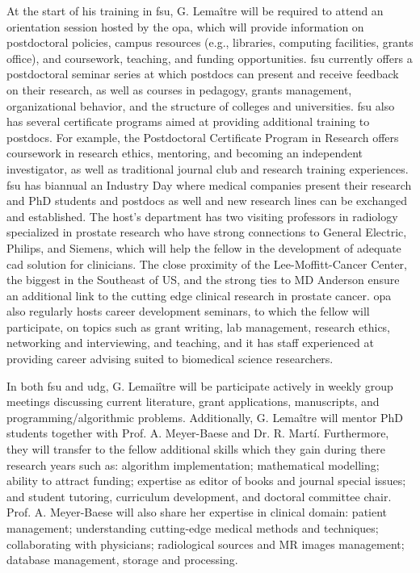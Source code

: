 At the start of his training in \ac{fsu}, G. Lema\^itre will be required to attend an orientation session hosted by the \ac{opa}, which will provide information on postdoctoral policies, campus resources (e.g., libraries, computing facilities, grants office), and coursework, teaching, and funding opportunities.
\ac{fsu} currently offers a postdoctoral seminar series at which postdocs can present and receive feedback on their research, as well as courses in pedagogy, grants management, organizational behavior, and the structure of colleges and universities.
\ac{fsu} also has several certificate programs aimed at providing additional training to postdocs.
For example, the Postdoctoral Certificate Program in Research offers coursework in research ethics, mentoring, and becoming an independent investigator, as well as traditional journal club and research training experiences.
\ac{fsu} has biannual an Industry Day where medical companies present their research and PhD students and postdocs as well and new research lines can be exchanged and established.
The host's department has two visiting professors in radiology specialized in prostate research who have strong connections to General Electric, Philips, and Siemens, which will help the fellow in the development of adequate \ac{cad} solution for clinicians.
The close proximity of the Lee-Moffitt-Cancer Center, the biggest in the Southeast of US, and the strong ties to MD Anderson ensure an additional link to the cutting edge clinical research in prostate cancer.
\ac{opa} also regularly hosts career development seminars, to which the fellow will participate, on topics such as grant writing, lab management, research ethics, networking and interviewing, and teaching, and it has staff experienced at providing career advising suited to biomedical science researchers.

In both \ac{fsu} and \ac{udg}, G. Lemai\^itre will be participate actively in weekly group meetings discussing current literature, grant applications, manuscripts, and programming/algorithmic problems.
Additionally, G. Lema\^itre will mentor PhD students together with Prof. A. Meyer-Baese and Dr. R. Mart\'i.
Furthermore, they will transfer to the fellow additional skills which they gain during there research years such as: algorithm implementation; mathematical modelling; ability to attract funding; expertise as editor of books and journal special issues; and student tutoring, curriculum development, and doctoral committee chair.
Prof. A. Meyer-Baese will also share her expertise in clinical domain: patient management; understanding cutting-edge medical methods and techniques; collaborating with physicians; radiological sources and MR images management; database management, storage and processing.

